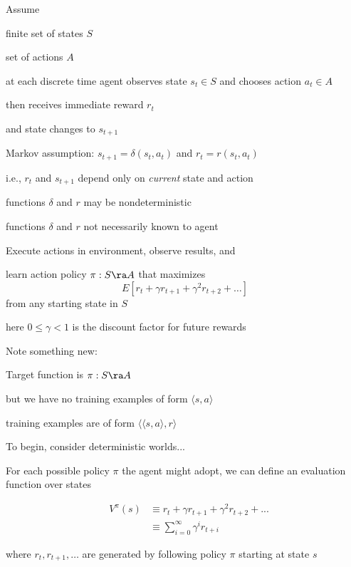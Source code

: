 Assume
\bi
\item  finite set of states $S$
\item  set of actions $A$
\item at each discrete time agent observes state $s_t \in S$ and chooses
action $a_t \in A$
\item then receives immediate reward $r_t$
\item and state changes to $s_{t+1}$
\item Markov assumption:  $s_{t+1} = \delta(s_t, a_t)$ and  $r_t = r(s_t,
a_t)$ 
\bi
\item i.e., $r_t$ and $s_{t+1}$ depend only on {\em current} state and action
\item functions $\delta$ and $r$ may be nondeterministic
\item functions $\delta$ and $r$ not necessarily known to agent
\ei
\ei



 \bk

Execute actions in environment, observe results, and
\bi
\item learn action policy $\pi : S \ra A$ that maximizes
\[ E[r_t + \gamma r_{t+1} + \gamma^2 r_{t+2} + \ldots ] \]
from any starting state in $S$
\item here $0 \leq \gamma < 1$ is the discount factor for future rewards
\ei

\bigskip

Note something new:
\bi
\item Target function is $\pi : S \ra A$
\item but we have no training examples of form $\langle s, a \rangle$
\item training examples are of form $\langle \langle  s, a \rangle , r \rangle$
\ei

 \bk

To begin, consider deterministic worlds...

\bigskip

For each possible policy $\pi$ the agent might adopt, we can define an evaluation
function over states

\begin{eqnarray}
 & V^{\pi}(s) & \equiv r_{t} + \gamma r_{t+1} + \gamma^{2} r_{t+2} + ...
\nonumber \\ 
& & \equiv \sum_{i=0}^{\infty} \gamma^{i} r_{t+i} \nonumber
\end{eqnarray}

where $ r_{t}, r_{t+1}, \ldots$ are generated by following policy $\pi$
starting at state $s$


